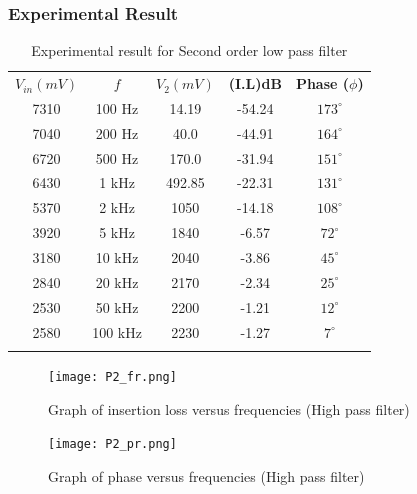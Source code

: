 \documentclass[a4paper, 12pt, english]{article}
\newcommand{\myrowcolour}{\rowcolor[gray]{0.925}}
\begin{document}
\subsubsection{Experimental Result}
\begin{table}[!ht]
	\caption{\label{tab:Table 2} Experimental result for Second order low pass filter}
	\centering
	\begin{tabular}{c c c c c}
		\toprule
		\textbf{$ V_{in} (mV)$}
		     & \textbf{$ f $}
		     & \textbf{$V_{2} (mV)$}
		     & \textbf{(I.L)dB}
		     & \textbf{Phase ($\phi $)}                                   \\

		\cmidrule[0.4pt](r{0.125em}){1-1}%
		\cmidrule[0.4pt](lr{0.125em}){2-2}%
		\cmidrule[0.4pt](lr{0.125em}){3-3}%
		\cmidrule[0.4pt](lr{0.125em}){4-4}%
		\cmidrule[0.4pt](lr{0.125em}){5-5}%
		7310 & 100 Hz                   & 14.19  & -54.24 & $173^{\circ}$ \\
		\myrowcolour%
		7040 & 200 Hz                   & 40.0   & -44.91 & $164^{\circ}$ \\
		6720 & 500 Hz                   & 170.0  & -31.94 & $151^{\circ}$ \\
		\myrowcolour%
		6430 & 1 kHz                    & 492.85 & -22.31 & $131^{\circ}$ \\
		5370 & 2 kHz                    & 1050   & -14.18 & $108^{\circ}$ \\
		\myrowcolour%
		3920 & 5 kHz                    & 1840   & -6.57  & $72^{\circ}$  \\
		3180 & 10 kHz                   & 2040   & -3.86  & $45^{\circ}$  \\
		\myrowcolour%
		2840 & 20 kHz                   & 2170   & -2.34  & $25^{\circ}$  \\
		2530 & 50 kHz                   & 2200   & -1.21  & $12^{\circ}$  \\
		\myrowcolour%
		2580 & 100 kHz                  & 2230   & -1.27  & $7^{\circ}$   \\
		\bottomrule                                                       \\
	\end{tabular}
\end{table}
\begin{figure}[!ht]
	\begin{center}
		\texttt{[image: P2\_fr.png]}
		\caption{\label{fig:P2_fr}Graph of insertion loss versus frequencies (High pass filter)}
	\end{center}
\end{figure}
\begin{figure}[!ht]
	\begin{center}
		\texttt{[image: P2\_pr.png]}
		\caption{\label{fig:P2_pr}Graph of phase versus frequencies (High pass filter)}
	\end{center}
\end{figure}
\FloatBarrier
\end{document}
